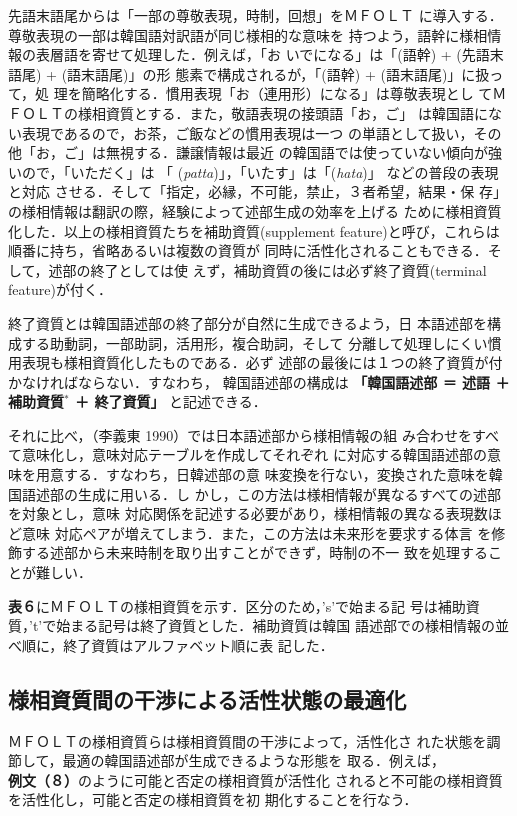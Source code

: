 先語末語尾からは「一部の尊敬表現，時制，回想」をＭＦＯＬＴ
に導入する．尊敬表現の一部は韓国語対訳語が同じ様相的な意味を
持つよう，語幹に様相情報の表層語を寄せて処理した．例えば，「お
いでになる」は「(語幹) + (先語末語尾) + (語末語尾)」の形
態素で構成されるが，「(語幹) + (語末語尾)」に扱って，処
理を簡略化する．慣用表現「お（連用形）になる」は尊敬表現とし
てＭＦＯＬＴの様相資質とする．また，敬語表現の接頭語「お，ご」
は韓国語にない表現であるので，お茶，ご飯などの慣用表現は一つ
の単語として扱い，その他「お，ご」は無視する．謙譲情報は最近
の韓国語では使っていない傾向が強いので，「いただく」は
「 ({\it patta})」，「いたす」は「({\it hata})」
などの普段の表現と対応
させる．そして「指定，必縁，不可能，禁止，３者希望，結果・保
存」の様相情報は翻訳の際，経験によって述部生成の効率を上げる
ために様相資質化した．以上の様相資質たちを補助資質(supplement 
feature)と呼び，これらは順番に持ち，省略あるいは複数の資質が
同時に活性化されることもできる．そして，述部の終了としては使
えず，補助資質の後には必ず終了資質(terminal feature)が付く．

終了資質とは韓国語述部の終了部分が自然に生成できるよう，日
本語述部を構成する助動詞，一部助詞，活用形，複合助詞，そして
分離して処理しにくい慣用表現も様相資質化したものである．必ず
述部の最後には１つの終了資質が付かなければならない．すなわち，
韓国語述部の構成は
{\bf 「韓国語述部 ＝ 述語 ＋ 補助資質{\footnotesize$^{*}$} ＋ 終了資質」}
と記述できる．

それに比べ，（李義東 1990）では日本語述部から様相情報の組
み合わせをすべて意味化し，意味対応テーブルを作成してそれぞれ
に対応する韓国語述部の意味を用意する．すなわち，日韓述部の意
味変換を行ない，変換された意味を韓国語述部の生成に用いる．し
かし，この方法は様相情報が異なるすべての述部を対象とし，意味
対応関係を記述する必要があり，様相情報の異なる表現数ほど意味
対応ペアが増えてしまう．また，この方法は未来形を要求する体言
を修飾する述部から未来時制を取り出すことができず，時制の不一
致を処理することが難しい．

{\bf 表６}にＭＦＯＬＴの様相資質を示す．区分のため，'s'で始まる記
号は補助資質，'t'で始まる記号は終了資質とした．補助資質は韓国
語述部での様相情報の並べ順に，終了資質はアルファベット順に表
記した．

\vspace{5mm}
\subsection{様相資質間の干渉による活性状態の最適化}
ＭＦＯＬＴの様相資質らは様相資質間の干渉によって，活性化さ
れた状態を調節して，最適の韓国語述部が生成できるような形態を
取る．例えば，{\bf 例文（８）}のように可能と否定の様相資質が活性化
されると不可能の様相資質を活性化し，可能と否定の様相資質を初
期化することを行なう．

